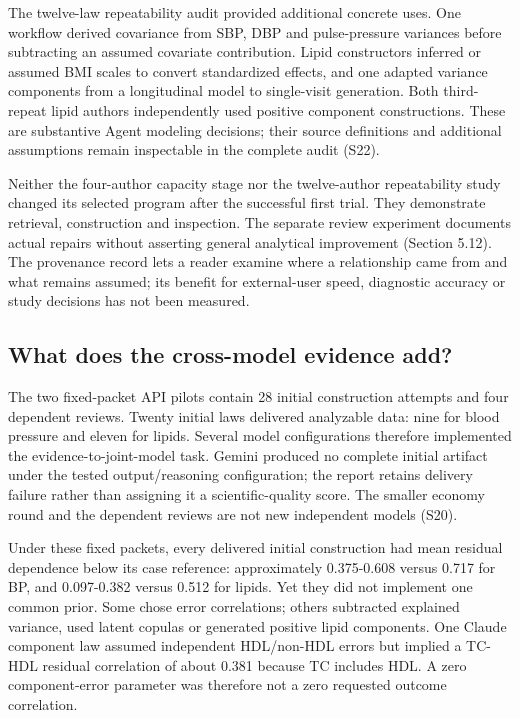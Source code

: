 \documentclass[11pt,letterpaper]{article}
\begin{document}
The twelve-law repeatability audit provided additional concrete uses. One workflow derived covariance from SBP, DBP and pulse-pressure variances before subtracting an assumed covariate contribution. Lipid constructors inferred or assumed BMI scales to convert standardized effects, and one adapted variance components from a longitudinal model to single-visit generation. Both third-repeat lipid authors independently used positive component constructions. These are substantive Agent modeling decisions; their source definitions and additional assumptions remain inspectable in the complete audit (S22).


Neither the four-author capacity stage nor the twelve-author repeatability study changed its selected program after the successful first trial. They demonstrate retrieval, construction and inspection. The separate review experiment documents actual repairs without asserting general analytical improvement (Section 5.12). The provenance record lets a reader examine where a relationship came from and what remains assumed; its benefit for external-user speed, diagnostic accuracy or study decisions has not been measured.


\subsection{What does the cross-model evidence add?}

The two fixed-packet API pilots contain 28 initial construction attempts and four dependent reviews. Twenty initial laws delivered analyzable data: nine for blood pressure and eleven for lipids. Several model configurations therefore implemented the evidence-to-joint-model task. Gemini produced no complete initial artifact under the tested output/\allowbreak{}reasoning configuration; the report retains delivery failure rather than assigning it a scientific-quality score. The smaller economy round and the dependent reviews are not new independent models (S20).


Under these fixed packets, every delivered initial construction had mean residual dependence below its case reference: approximately 0.375-0.608 versus 0.717 for BP, and 0.097-0.382 versus 0.512 for lipids. Yet they did not implement one common prior. Some chose error correlations; others subtracted explained variance, used latent copulas or generated positive lipid components. One Claude component law assumed independent HDL/\allowbreak{}non-HDL errors but implied a TC-HDL residual correlation of about 0.381 because TC includes HDL. A zero component-error parameter was therefore not a zero requested outcome correlation.
\end{document}
